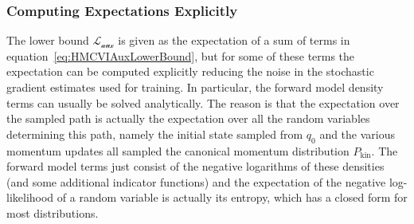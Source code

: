\subsubsection{Computing Expectations Explicitly}

The lower bound $\mathcal{L_\textrm{aux}}$ is given as the expectation of a sum of terms in equation~\eqref{eq:HMCVIAuxLowerBound}, but for some of these terms the expectation can be computed explicitly reducing the noise in the stochastic gradient estimates used for training. In particular, the forward model density terms can usually be solved analytically. The reason is that the expectation over the sampled path is actually the expectation over all the random variables determining this path, namely the initial state sampled from $q_0$ and the various momentum updates all sampled the canonical momentum distribution $P_\textrm{kin}$. The forward model terms just consist of the negative logarithms of these densities (and some additional indicator functions) and the expectation of the negative log-likelihood of a random variable is actually its entropy, which has a closed form for most distributions.
